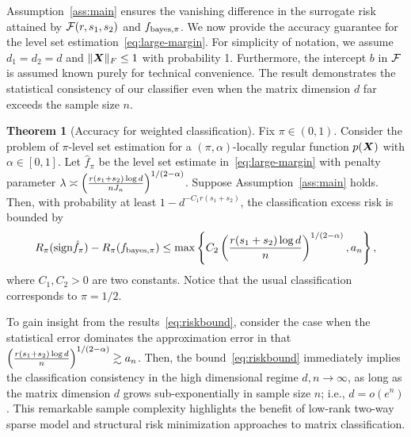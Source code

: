 \documentclass[11pt]{article}
\theoremstyle{definition}
\newtheorem{thm}{Theorem}[section]
\def\sign{\textup{sign}}
\def\bayesf{f_{\textup{bayes}}}
\def\bayesS{S_{\textup{bayes}}}
\def\bayespif{f_{\textup{bayes},\pi}}
\begin{document}
Assumption~\ref{ass:main} ensures the vanishing difference in the surrogate risk attained by $\mathcal{F}(r,s_1,s_2)$ and  $\bayespif$. 
We now provide the accuracy guarantee for the level set estimation~\eqref{eq:large-margin}. For simplicity of notation, we assume $d_1=d_2=d$ and $\lVert\bm X\rVert_F\leq 1$ with probability 1. Furthermore, the intercept $b$ in $\mathcal{F}$ is assumed known purely for technical convenience. The result demonstrates the statistical consistency of our classifier even when the matrix dimension $d$ far exceeds the sample size $n$. 

\begin{thm}[Accuracy for weighted classification]\label{thm:main} Fix $\pi\in(0,1)$. Consider the problem of $\pi$-level set estimation for a  $(\pi,\alpha)$-locally regular function $p(\bm X)$ with $\alpha\in[0,1]$. Let $\hat f_\pi$ be the level set estimate in~\eqref{eq:large-margin} with penalty parameter $\lambda\asymp \left( r(s_1+s_2)\log d \over  nJ_n\right)^{1/(2-\alpha)}$. Suppose Assumption~\ref{ass:main} holds. Then, with probability at least $1-d^{-C_1r(s_1+s_2)}$, the classification excess risk is bounded by 
\begin{equation}\label{eq:riskbound}
 R_{\pi}(\sign \hat f_\pi)-R_{\pi}(\bayespif) \leq \max\left\{ C_2\left({r(s_1+s_2)\log d \over n}\right)^{1/(2-\alpha)}, a_n\right\},
\end{equation}
where $C_1,C_2>0$ are two constants. Notice that the usual classification corresponds to $\pi = 1/2$. 
\end{thm}

To gain insight from the results~\eqref{eq:riskbound}, consider the case when the statistical error dominates the approximation error in that $ \left({r(s_1+s_2)\log d \over n}\right)^{1/(2-\alpha)}\gtrsim a_n$. Then, the bound~\eqref{eq:riskbound} immediately implies the classification consistency in the high dimensional regime $d,n\to \infty$, as long as the matrix dimension $d$ grows sub-exponentially in sample size $n$; i.e., $d=o(e^n)$. This remarkable sample complexity highlights the benefit of low-rank two-way sparse model and structural risk minimization approaches to matrix classification. 

\end{document}
